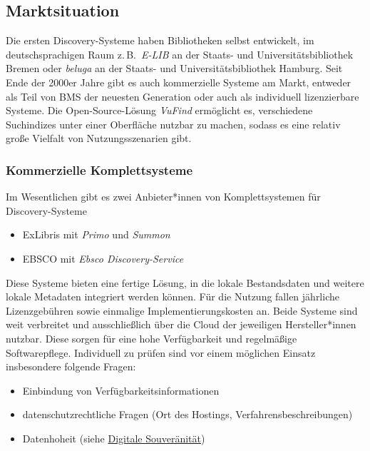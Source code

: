 \documentclass[
  11pt,
  letterpaper,
  DIV=11,
  twoside]{scrreprt}
\begin{document}
\subsection{Marktsituation}\label{marktsituation}

Die ersten Discovery-Systeme haben Bibliotheken selbst entwickelt, im
deutschsprachigen Raum z.\,B.~\emph{E-LIB} an der Staats- und
Universitätsbibliothek Bremen oder \emph{beluga} an der Staats- und
Universitätsbibliothek Hamburg. Seit Ende der 2000er Jahre gibt es auch
kommerzielle Systeme am Markt, entweder als Teil von BMS der neuesten
Generation oder auch als individuell lizenzierbare Systeme. Die
Open-Source-Lösung \emph{VuFind} ermöglicht es, verschiedene Suchindizes
unter einer Oberfläche nutzbar zu machen, sodass es eine relativ große
Vielfalt von Nutzungsszenarien gibt.

\subsubsection{Kommerzielle
Komplettsysteme}\label{kommerzielle-komplettsysteme}

Im Wesentlichen gibt es zwei Anbieter*innen von Komplettsystemen für
Discovery-Systeme

\begin{itemize}
\item
  ExLibris mit \emph{Primo} und \emph{Summon}
\item
  EBSCO mit \emph{Ebsco Discovery-Service}
\end{itemize}

Diese Systeme bieten eine fertige Lösung, in die lokale Bestandsdaten
und weitere lokale Metadaten integriert werden können. Für die Nutzung
fallen jährliche Lizenzgebühren sowie einmalige Implementierungskosten
an. Beide Systeme sind weit verbreitet und ausschließlich über die Cloud
der jeweiligen Hersteller*innen nutzbar. Diese sorgen für eine hohe
Verfügbarkeit und regelmäßige Softwarepflege. Individuell zu prüfen sind
vor einem möglichen Einsatz insbesondere folgende Fragen:

\begin{itemize}
\item
  Einbindung von Verfügbarkeitsinformationen
\item
  datenschutzrechtliche Fragen (Ort des Hostings,
  Verfahrensbeschreibungen)
\item
  Datenhoheit (siehe \hyperref[digitale-souveruxe4nituxe4t]{Digitale
  Souveränität})
\end{itemize}
\end{document}
